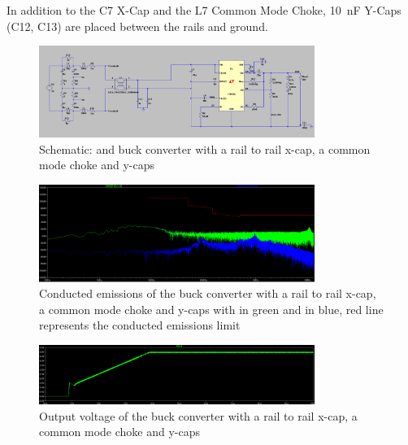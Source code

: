 In addition to the C7 X-Cap and the L7 Common Mode Choke, \qty{10}{\nano\farad} Y-Caps (C12, C13) are placed between the rails and ground.

\begin{figure}[htbp]
    \centering
    \includegraphics[width=0.8\textwidth]{img/schematic_cmc_x_cap_and_y_caps.png}
    \caption{Schematic:  and buck converter with a rail to rail x-cap, a common mode choke and y-caps}
    \label{fig:cmc_x_cap_y_cap_schematic}
\end{figure}

\begin{figure}[htbp]
    \centering
    \includegraphics[width=0.8\textwidth]{img/emc_cmc_x_cap_and_y_caps.png}
    \caption{Conducted emissions of the buck converter with a rail to rail x-cap, a common mode choke and y-caps with  in green and  in blue, red line represents the conducted emissions limit}
    \label{fig:cmc_x_cap_y_cap_emc}
\end{figure}

\begin{figure}[htbp]
    \centering
    \includegraphics[width=0.8\textwidth]{img/vout_cmc_x_cap_and_y_caps.png}
    \caption{Output voltage of the buck converter with a rail to rail x-cap, a common mode choke and y-caps}
    \label{fig:cmc_x_cap_y_cap_vout}
\end{figure}




